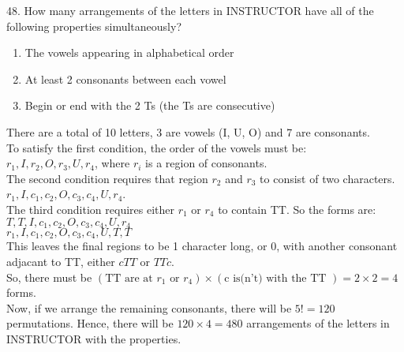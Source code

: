 \documentclass[12pt]{article}
\begin{document}
48. How many arrangements of the letters in INSTRUCTOR have all of the
following properties simultaneously?
\begin{enumerate}[label=(\alph*)]
    \item The vowels appearing in alphabetical order
    \item At least 2 consonants between each vowel
    \item Begin or end with the 2 Ts (the Ts are consecutive)
\end{enumerate}
\begin{solution}
    There are a total of 10 letters, 3 are vowels (I, U, O) and 7 are 
    consonants. \\
    To satisfy the first condition, the order of the vowels must be: \\
    $r_1,I, r_2, O, r_3, U, r_4$, where $r_i$ is a region of consonants. \\
    The second condition requires that region $r_2$ and $r_3$ to consist 
    of two characters. $r_1, I, c_1, c_2, O, c_3, c_4, U, r_4$. \\
    The third condition requires either $r_1$ or $r_4$ to contain TT. So 
    the forms are: \\
    $T, T, I, c_1, c_2, O, c_3, c_4, U, r_4$ \\
    $r_1, I, c_1, c_2, O, c_3, c_4, U, T, T$ \\
    This leaves the final regions to be 1 character long, or 0, with 
    another consonant adjacant to TT, either $cTT$ or $TTc$. \\
    So, there must be $(\text{TT are at }r_1 \text{ or } r_4) \times 
    (\text{c is(n't) with the TT }) = 2 \times 2 = 4$ 
    forms. \\
    Now, if we arrange the remaining consonants, there will be $5!=120$ 
    permutations. Hence, there will be $120 \times 4 = 480$ arrangements 
    of the letters in INSTRUCTOR with the properties. 
\end{solution}
\end{document}
